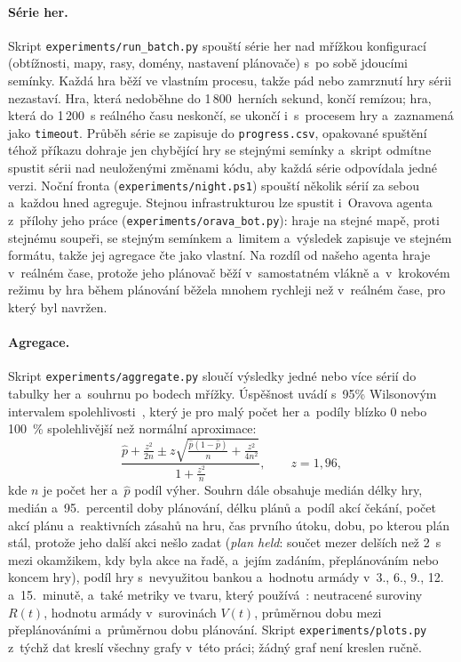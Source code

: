 \paragraph{Série her.} Skript \texttt{experiments/run\_batch.py} spouští série her nad mřížkou konfigurací (obtížnosti, mapy, rasy, domény, nastavení plánovače) s~po sobě jdoucími semínky. Každá hra běží ve vlastním procesu, takže pád nebo zamrznutí hry sérii nezastaví. Hra, která nedoběhne do 1\,800~herních sekund, končí remízou; hra, která do 1\,200~s reálného času neskončí, se ukončí i~s~procesem hry a~zaznamená jako \texttt{timeout}. Průběh série se zapisuje do \texttt{progress.csv}, opakované spuštění téhož příkazu dohraje jen chybějící hry se stejnými semínky a~skript odmítne spustit sérii nad neuloženými změnami kódu, aby každá série odpovídala jedné verzi. Noční fronta (\texttt{experiments/night.ps1}) spouští několik sérií za sebou a~každou hned agreguje. Stejnou infrastrukturou lze spustit i~Oravova agenta z~přílohy jeho práce (\nolinkurl{experiments/orava_bot.py}): hraje na stejné mapě, proti stejnému soupeři, se stejným semínkem a~limitem a~výsledek zapisuje ve stejném formátu, takže jej agregace čte jako vlastní. Na rozdíl od našeho agenta hraje v~reálném čase, protože jeho plánovač běží v~samostatném vlákně a~v~krokovém režimu by hra během plánování běžela mnohem rychleji než v~reálném čase, pro který byl navržen.

\paragraph{Agregace.} Skript \texttt{experiments/aggregate.py} sloučí výsledky jedné nebo více sérií do tabulky her a~souhrnu po bodech mřížky. Úspěšnost uvádí s~95\% Wilsonovým intervalem spolehlivosti~\cite{Wilson1927}, který je pro malý počet her a~podíly blízko 0 nebo 100~\% spolehlivější než normální aproximace:
\[
	\frac{\hat p + \frac{z^2}{2n} \pm z\sqrt{\frac{\hat p(1-\hat p)}{n} + \frac{z^2}{4n^2}}}{1 + \frac{z^2}{n}}, \qquad z = 1{,}96,
\]
kde $n$ je počet her a~$\hat p$ podíl výher. Souhrn dále obsahuje medián délky hry, medián a~95.~percentil doby plánování, délku plánů a~podíl akcí čekání, počet akcí plánu a~reaktivních zásahů na hru, čas prvního útoku, dobu, po kterou plán stál, protože jeho další akci nešlo zadat (\emph{plan held}: součet mezer delších než 2~s mezi okamžikem, kdy byla akce na řadě, a~jejím zadáním, přeplánováním nebo koncem hry), podíl hry s~nevyužitou bankou a~hodnotu armády v~3., 6., 9., 12. a~15.~minutě, a~také metriky ve tvaru, který používá~\cite{Orava2025}: neutracené suroviny $R(t)$, hodnotu armády v~surovinách $V(t)$, průměrnou dobu mezi přeplánováními a~průměrnou dobu plánování. Skript \texttt{experiments/plots.py} z~týchž dat kreslí všechny grafy v~této práci; žádný graf není kreslen ručně.

